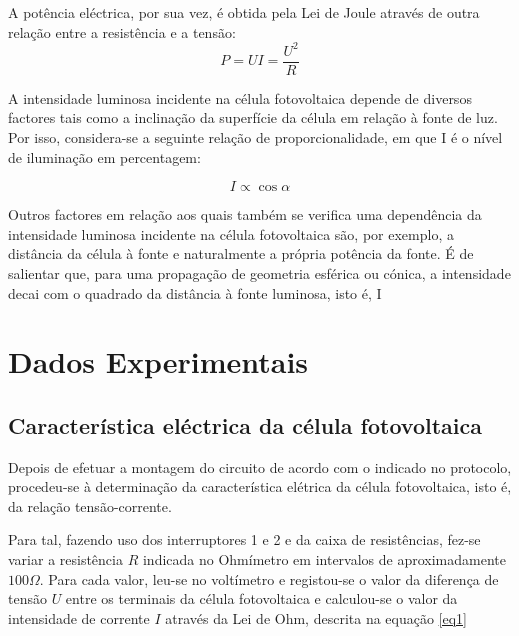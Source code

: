 \documentclass[9pt]{extarticle}
\begin{document}
\begin{multicols}{2}
\par A potência eléctrica, por sua vez, é obtida pela Lei de Joule através de outra relação entre a resistência e a tensão:
\begin{equation} \label{eq2}
P=UI=\frac{U^2}{R}
\end{equation}

\par
A intensidade luminosa incidente na célula fotovoltaica depende de diversos factores tais como a inclinação da superfície da célula em relação à fonte de luz. Por isso, considera-se a seguinte relação de proporcionalidade, em que I é o nível de iluminação em percentagem:

\begin{equation}
I\propto\cos{\alpha}
\end{equation}

\par Outros factores em relação aos quais também se verifica uma dependência da intensidade luminosa incidente na célula fotovoltaica são, por exemplo, a distância da célula à fonte e naturalmente a própria potência da fonte. É de salientar que, para uma propagação de geometria esférica ou cónica, a intensidade decai com o quadrado da distância à fonte luminosa, isto é, I \propto {}


\section{Dados Experimentais}

\subsection*{\normalsize Característica eléctrica da célula fotovoltaica}

\par Depois de efetuar a montagem do circuito de acordo com o indicado no protocolo, procedeu-se à determinação da característica elétrica da célula fotovoltaica, isto é, da relação tensão-corrente.

\par Para tal, fazendo uso dos interruptores 1 e 2 e da caixa de resistências, fez-se variar a resistência $R$ indicada no Ohmímetro em intervalos de aproximadamente $100\Omega$. Para cada valor, leu-se no voltímetro e registou-se o valor da diferença de tensão $U$ entre os terminais da célula fotovoltaica e calculou-se o valor da intensidade de corrente $I$ através da Lei de Ohm, descrita na equação \eqref{eq1}


\end{multicols}
\end{document}
